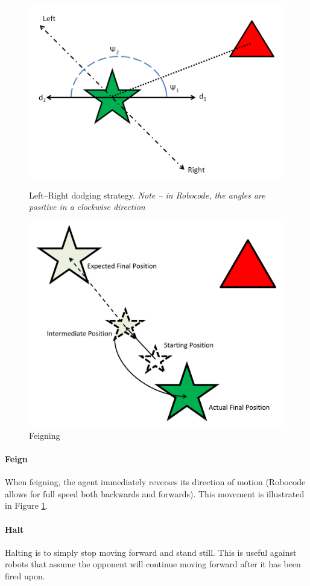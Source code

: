 \documentclass{article}
\theoremstyle{plain}
\theoremstyle{definition}
\theoremstyle{remark}
\begin{document}
\begin{figure}[t]
\begin{minipage}[b]{0.5\linewidth}
	\centering
		\includegraphics[width=6 cm]{LR}
	\caption{Left--Right dodging strategy. \emph{Note -- in Robocode, the angles are positive in a clockwise direction}}
	\label{LR}
\end{minipage}
\hspace{0.5cm}
\begin{minipage}[b]{0.5\linewidth}
	\centering
		\includegraphics[width=6 cm]{Feign.png}
	\caption{Feigning}
	\label{feign}
\end{minipage}
\end{figure}

\paragraph{Feign}
When feigning, the agent immediately reverses its direction of motion (Robocode allows for full speed both backwards and forwards). This movement is illustrated in Figure \ref{feign}.

\paragraph{Halt}
Halting is to simply stop moving forward and stand still. This is useful against robots that assume the opponent will continue moving forward after it has been fired upon.
\end{document}
